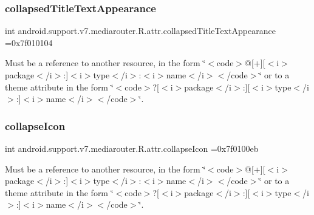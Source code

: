 \subsubsection{\texorpdfstring{collapsed\+Title\+Text\+Appearance}{collapsedTitleTextAppearance}}
{\footnotesize\ttfamily int android.\+support.\+v7.\+mediarouter.\+R.\+attr.\+collapsed\+Title\+Text\+Appearance =0x7f010104\hspace{0.3cm}{\ttfamily [static]}}

Must be a reference to another resource, in the form \char`\"{}$<$code$>$@\mbox{[}+\mbox{]}\mbox{[}$<$i$>$package$<$/i$>$\+:\mbox{]}$<$i$>$type$<$/i$>$\+:$<$i$>$name$<$/i$>$$<$/code$>$\char`\"{} or to a theme attribute in the form \char`\"{}$<$code$>$?\mbox{[}$<$i$>$package$<$/i$>$\+:\mbox{]}\mbox{[}$<$i$>$type$<$/i$>$\+:\mbox{]}$<$i$>$name$<$/i$>$$<$/code$>$\char`\"{}. \mbox{\label{classandroid_1_1support_1_1v7_1_1mediarouter_1_1R_1_1attr_a7da4c775773862525355b5217dba4a78}} 
\subsubsection{\texorpdfstring{collapse\+Icon}{collapseIcon}}
{\footnotesize\ttfamily int android.\+support.\+v7.\+mediarouter.\+R.\+attr.\+collapse\+Icon =0x7f0100eb\hspace{0.3cm}{\ttfamily [static]}}

Must be a reference to another resource, in the form \char`\"{}$<$code$>$@\mbox{[}+\mbox{]}\mbox{[}$<$i$>$package$<$/i$>$\+:\mbox{]}$<$i$>$type$<$/i$>$\+:$<$i$>$name$<$/i$>$$<$/code$>$\char`\"{} or to a theme attribute in the form \char`\"{}$<$code$>$?\mbox{[}$<$i$>$package$<$/i$>$\+:\mbox{]}\mbox{[}$<$i$>$type$<$/i$>$\+:\mbox{]}$<$i$>$name$<$/i$>$$<$/code$>$\char`\"{}. \mbox{\label{classandroid_1_1support_1_1v7_1_1mediarouter_1_1R_1_1attr_a4bb03a327a2223476d43ef921e0826a6}} 
